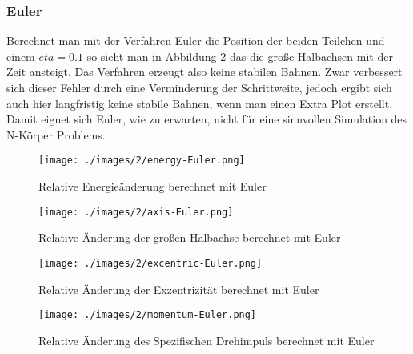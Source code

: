 \subsubsection{Euler}
Berechnet man mit der Verfahren Euler die Position der beiden Teilchen
und einem $eta = 0.1$ so sieht man in Abbildung \ref{fig:2body:euler:axis}
das die große Halbachsen mit der Zeit ansteigt. Das Verfahren
erzeugt also keine stabilen Bahnen. Zwar verbessert sich dieser Fehler
durch eine Verminderung der Schrittweite, jedoch ergibt sich auch hier
langfristig keine stabile Bahnen, wenn man einen Extra Plot erstellt.
Damit eignet sich Euler, wie zu erwarten, nicht für eine sinnvollen Simulation
des N-Körper Problems.
\begin{figure}
  \begin{center}
    \texttt{[image: ./images/2/energy-Euler.png]}
  \end{center}
  \caption{Relative Energieänderung berechnet mit Euler}
  \label{fig:2body:euler:energy}
\end{figure}
\begin{figure}
  \begin{center}
    \texttt{[image: ./images/2/axis-Euler.png]}
  \end{center}
  \caption{Relative \"Anderung der großen Halbachse berechnet mit Euler}
  \label{fig:2body:euler:axis}
\end{figure}
\begin{figure}
  \begin{center}
    \texttt{[image: ./images/2/excentric-Euler.png]}
  \end{center}
  \caption{Relative \"Anderung der Exzentrizität berechnet mit Euler}
  \label{fig:2body:euler:excentric}
\end{figure}
\begin{figure}
  \begin{center}
    \texttt{[image: ./images/2/momentum-Euler.png]}
  \end{center}
  \caption{Relative \"Anderung des Spezifischen Drehimpuls berechnet mit Euler}
  \label{fig:2body:euler:spec_angular_momentum}
\end{figure}

